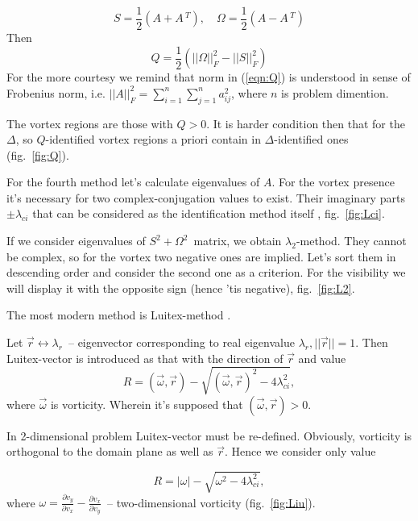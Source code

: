 \documentclass[a4wide,fontsize=12pt]{article}
\begin{document}
\begin{equation}
 S=\frac{1}{2}\left(A +A\,^T \right) ,\quad \Omega=\frac{1}{2} \left( A - A\,^T\right) 
  \label{NSdim}
\end{equation}
Then
\begin{equation}
  Q=\frac{1}{2} \left( ||\Omega||^2_F-||S||^2_F \right) 
  \label{eqn:Q}
 \end{equation}
For the more courtesy we remind that norm in (\ref{eqn:Q}) is understood in sense of Frobenius norm, i.e. $||A||^2_F=\sum \limits_{i=1}^n \sum \limits_{j=1}^n a_{ij}^2$, where $n$ is problem dimention.

The vortex regions are those with $Q>0$. It is harder condition then that for the $\Delta$, so $Q$-identified vortex regions a priori contain in $\Delta$-identified ones (fig.~\ref{fig:Q}).

For the fourth method let's calculate eigenvalues of $A$. For the vortex presence it's necessary for two complex-conjugation values to exist. Their imaginary parts $\pm\lambda_{ci}$ that can be considered as the identification method itself \cite{vortex}, fig.~\ref{fig:Lci}.

If we consider eigenvalues of $S^2+\Omega^2$~matrix, we obtain $\lambda_2$-method. They cannot be complex, so for the vortex two negative ones are implied. Let's sort them in descending order and consider the second one as a criterion\cite{vortex,Hussain}. For the visibility we will display it with the opposite sign (hence 'tis negative), fig.~\ref{fig:L2}.

The most modern method is Luitex-method \cite{vortex}.

Let $\vec r \longleftrightarrow \lambda_r$~-- eigenvector corresponding to real eigenvalue $\lambda_r, ||\vec r||=1$. Then Luitex-vector is introduced as that with the direction of $\vec r$ and value
 $$R=(\vec \omega,\vec r)-\sqrt{(\vec \omega,\vec r)^2-4\lambda_{ci}^2},$$\noindent where $\vec \omega$ is vorticity. Wherein it's supposed that $(\vec \omega,\vec r)>0$.
 
 In 2-dimensional problem Luitex-vector must be re-defined. Obviously, vorticity is orthogonal to the domain plane as well as $\vec r$. Hence we consider only value
 
 $$R=|\omega|- \sqrt{\omega^2-4\lambda_{ci}^2},$$\noindent where $\omega=\frac{\partial v_y}{\partial v_x}-\frac{\partial v_x}{\partial v_y}$~-- two-dimensional vorticity (fig.~\ref{fig:Liu}).
\end{document}
